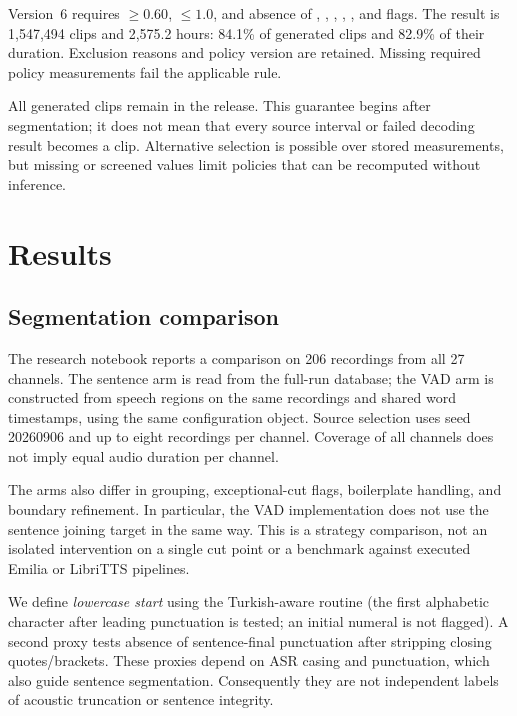 \documentclass[11pt,a4paper]{article}
\begin{document}
Version~6 requires  $\ge 0.60$,
 $\le 1.0$, and absence of
, , , ,
,  and  flags.
The result is 1,547,494 clips and 2,575.2 hours: 84.1\% of generated clips
and 82.9\% of their duration. Exclusion reasons and policy version are
retained. Missing required policy measurements fail the applicable rule.

All generated clips remain in the release. This guarantee begins after
segmentation; it does not mean that every source interval or failed decoding
result becomes a clip. Alternative selection is possible over stored
measurements, but missing or screened values limit policies that can be
recomputed without inference.

\section{Results}
\subsection{Segmentation comparison}
\label{sec:ablation}
The research notebook reports a comparison on 206 recordings from all
27 channels. The sentence arm is read from the full-run database; the VAD
arm is constructed from speech regions on the same recordings and shared
word timestamps, using the same configuration object. Source selection uses
seed 20260906 and up to eight recordings per channel. Coverage of all
channels does not imply equal audio duration per channel.

The arms also differ in grouping, exceptional-cut flags, boilerplate handling,
and boundary refinement. In particular, the VAD implementation does not use
the sentence joining target in the same way. This is a strategy comparison,
not an isolated intervention on a single cut point or a benchmark against
executed Emilia or LibriTTS pipelines.

We define \emph{lowercase start} using the Turkish-aware 
routine (the first alphabetic character after leading punctuation is tested;
an initial numeral is not flagged). A second proxy tests absence of
sentence-final punctuation after stripping closing quotes/brackets. These
proxies depend on ASR casing and punctuation, which also guide sentence
segmentation. Consequently they are not independent labels of acoustic
truncation or sentence integrity.
\end{document}
